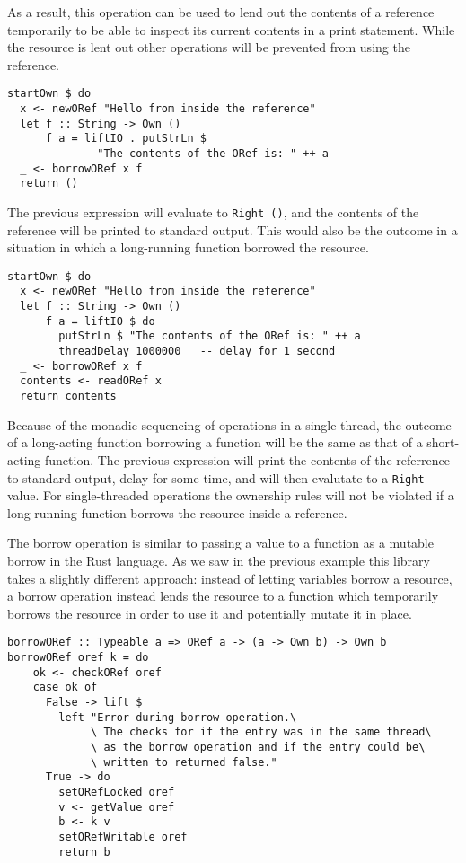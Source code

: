 \documentclass[onehalf,11pt]{beavtex}
\begin{document}
As a result, this operation can be used to lend out the contents of a reference
temporarily to be able to inspect its current contents in a print statement.
While the resource is lent out other operations will be prevented from using the
reference.

\begin{lstlisting}
startOwn $ do
  x <- newORef "Hello from inside the reference"
  let f :: String -> Own ()
      f a = liftIO . putStrLn $
              "The contents of the ORef is: " ++ a
  _ <- borrowORef x f
  return ()
\end{lstlisting}

The previous expression will evaluate to \texttt{Right ()}, and the contents
of the reference will be printed to standard output.
This would also be the outcome in a situation in which a long-running function
borrowed the resource.

\begin{lstlisting}
startOwn $ do
  x <- newORef "Hello from inside the reference"
  let f :: String -> Own ()
      f a = liftIO $ do
        putStrLn $ "The contents of the ORef is: " ++ a
        threadDelay 1000000   -- delay for 1 second
  _ <- borrowORef x f
  contents <- readORef x
  return contents
\end{lstlisting}

Because of the monadic sequencing of operations in a single thread, the outcome
of a long-acting function borrowing a function will be the same as that of a
short-acting function.
The previous expression will print the contents of the referrence to standard
output, delay for some time, and will then evalutate to a \texttt{Right} value.
For single-threaded operations the ownership rules will not be violated if
a long-running function borrows the resource inside a reference.

The borrow operation is similar to passing a value to a function as a mutable
borrow in the Rust language.
As we saw in the previous example this library takes a slightly different approach:
instead of letting variables borrow a resource, a borrow operation instead lends
the resource to a function which temporarily borrows the resource in order to
use it and potentially mutate it in place.

\begin{verbatim}
borrowORef :: Typeable a => ORef a -> (a -> Own b) -> Own b
borrowORef oref k = do
    ok <- checkORef oref
    case ok of
      False -> lift $
        left "Error during borrow operation.\
             \ The checks for if the entry was in the same thread\
             \ as the borrow operation and if the entry could be\
             \ written to returned false."
      True -> do
        setORefLocked oref
        v <- getValue oref
        b <- k v
        setORefWritable oref
        return b
\end{verbatim}
\end{document}
